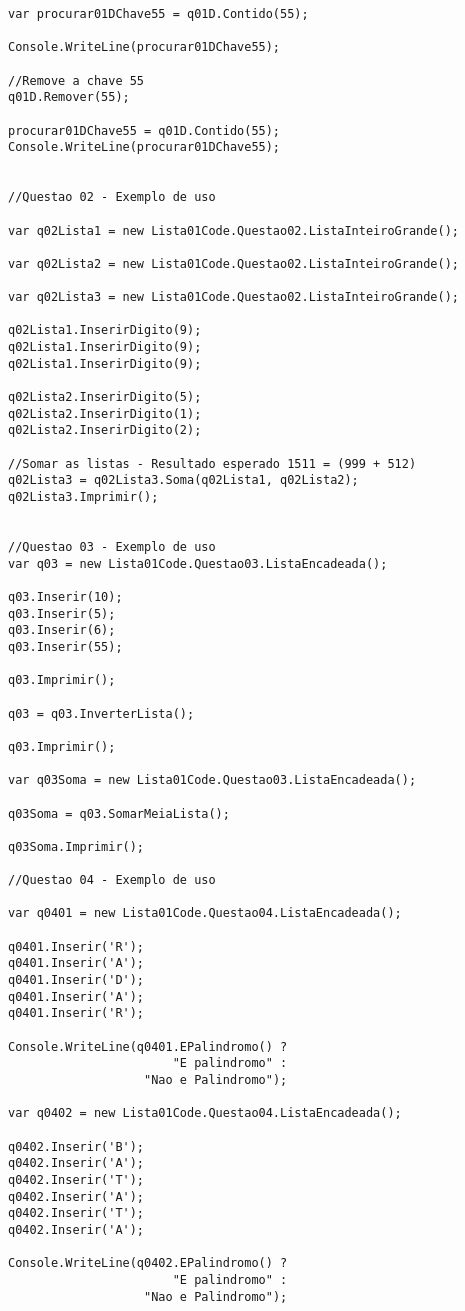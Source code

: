 \documentclass[portuguese,12pt,a4paper]{article}
\begin{document}
\begin{lstlisting}
var procurar01DChave55 = q01D.Contido(55);

Console.WriteLine(procurar01DChave55);

//Remove a chave 55
q01D.Remover(55);

procurar01DChave55 = q01D.Contido(55);
Console.WriteLine(procurar01DChave55);


//Questao 02 - Exemplo de uso

var q02Lista1 = new Lista01Code.Questao02.ListaInteiroGrande();

var q02Lista2 = new Lista01Code.Questao02.ListaInteiroGrande();

var q02Lista3 = new Lista01Code.Questao02.ListaInteiroGrande();

q02Lista1.InserirDigito(9);
q02Lista1.InserirDigito(9);
q02Lista1.InserirDigito(9);

q02Lista2.InserirDigito(5);
q02Lista2.InserirDigito(1);
q02Lista2.InserirDigito(2);

//Somar as listas - Resultado esperado 1511 = (999 + 512)
q02Lista3 = q02Lista3.Soma(q02Lista1, q02Lista2);
q02Lista3.Imprimir();


//Questao 03 - Exemplo de uso
var q03 = new Lista01Code.Questao03.ListaEncadeada();

q03.Inserir(10);
q03.Inserir(5);
q03.Inserir(6);
q03.Inserir(55);

q03.Imprimir();

q03 = q03.InverterLista();

q03.Imprimir();

var q03Soma = new Lista01Code.Questao03.ListaEncadeada();

q03Soma = q03.SomarMeiaLista();

q03Soma.Imprimir();

//Questao 04 - Exemplo de uso

var q0401 = new Lista01Code.Questao04.ListaEncadeada();

q0401.Inserir('R');
q0401.Inserir('A');
q0401.Inserir('D');
q0401.Inserir('A');
q0401.Inserir('R');

Console.WriteLine(q0401.EPalindromo() ? 
                       "E palindromo" : 
                   "Nao e Palindromo");

var q0402 = new Lista01Code.Questao04.ListaEncadeada();

q0402.Inserir('B');
q0402.Inserir('A');
q0402.Inserir('T');
q0402.Inserir('A');
q0402.Inserir('T');
q0402.Inserir('A');

Console.WriteLine(q0402.EPalindromo() ? 
                       "E palindromo" : 
                   "Nao e Palindromo");



\end{lstlisting}
\end{document}
